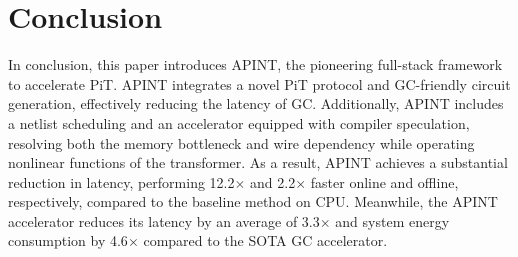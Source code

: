 \section{Conclusion}
In conclusion, this paper introduces APINT, the pioneering full-stack framework to accelerate PiT. APINT integrates a novel PiT protocol and GC-friendly circuit generation, effectively reducing the latency of GC. Additionally, APINT includes a netlist scheduling and an accelerator equipped with compiler speculation, resolving both the memory bottleneck and wire dependency while operating nonlinear functions of the transformer. As a result, APINT achieves a substantial reduction in latency, performing 12.2$\times$ and 2.2$\times$ faster online and offline, respectively, compared to the baseline method on CPU. 
Meanwhile, the APINT accelerator reduces its latency by an average of 3.3$\times$ and system energy consumption by 4.6$\times$ compared to the SOTA GC accelerator.

